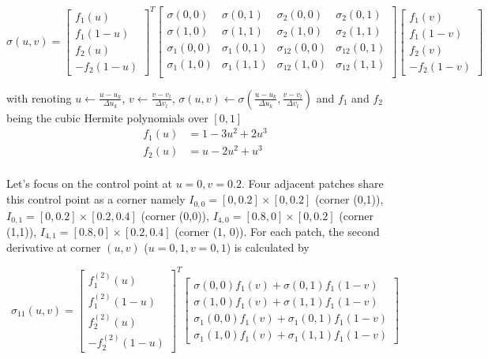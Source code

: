 \documentclass[a4paper, 11pt]{article}
\begin{document}
\begin{equation}
  \sigma(u,v) = \begin{bmatrix} f_1(u) \\ f_1(1-u) \\ f_2(u) \\ -f_2(1-u) \end{bmatrix}^T
  \begin{bmatrix}
    \sigma(0,0) & \sigma(0,1) & \sigma_2(0,0) & \sigma_2(0,1) \\
    \sigma(1,0) & \sigma(1,1) & \sigma_2(1,0) & \sigma_2(1,1) \\
    \sigma_1(0,0) & \sigma_1(0,1) & \sigma_{12}(0,0) & \sigma_{12}(0,1) \\
    \sigma_1(1,0) & \sigma_1(1,1) & \sigma_{12}(1,0) & \sigma_{12}(1,1) \\
  \end{bmatrix}
  \begin{bmatrix} f_1(v) \\ f_1(1-v) \\  f_2(v) \\ - f_2(1-v) \end{bmatrix}
\end{equation}


with renoting $u \leftarrow \frac{u-u_k}{\Delta u_k}$, $v \leftarrow \frac{v-v_l}{\Delta v_l}$, $\sigma(u,v) \leftarrow 
\sigma(\frac{u-u_k}{\Delta u_k}, \frac{v-v_l}{\Delta v_l})$ and $f_1$ and $f_2$ being the cubic Hermite polynomials over 
$[0,1]$
\begin{align*}
  f_1(u) &= 1 - 3u^2 + 2u^3 \\
  f_2(u) &= u - 2u^2 + u^3 \\
\end{align*}
  

Let's focus on the control point at $u=0, v=0.2$. Four adjacent patches share this control point as a corner namely 
$I_{0,0}=[0, 0.2]\times[0,0.2]$ (corner (0,1)), $I_{0, 1}=[0, 0.2]\times[0.2, 0.4]$ (corner (0,0)), $I_{4, 0} = [0.8, 
0]\times[0, 0.2]$ (corner (1,1)), $I_{4, 1} = [0.8, 0]\times[0.2, 0.4]$ (corner (1, 0)). For each patch, the second 
derivative at corner $(u,v)$ ($u=0,1, v=0, 1$) is calculated by

\begin{equation}
\sigma_{11}(u,v) =  \begin{bmatrix} f_1^{(2)}(u) \\ f_1^{(2)}(1-u) \\ f_2^{(2)}(u) \\ -f_2^{(2)}(1-u) \end{bmatrix}^T
\begin{bmatrix} \sigma(0,0) f_1(v) + \sigma(0,1) f_1(1-v) \\ \sigma(1,0) f_1(v) + \sigma(1,1) f_1(1-v) \\  \sigma_1(0,0) 
f_1(v) + \sigma_1(0,1) f_1(1-v) \\ \sigma_1(1,0) f_1(v) + \sigma_1(1,1) f_1(1-v) \end{bmatrix}
\end{equation}
\end{document}
